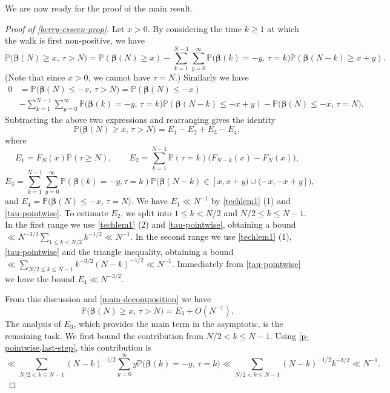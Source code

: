 \documentclass[11pt,reqno]{amsart}
\numberwithin{equation}{section}
\theoremstyle{definition}
\theoremstyle{remark}
\newcommand{\mb}{\mathbb}
\def\boldbeta{\boldsymbol\beta}
\renewcommand{\le}{\leqslant}
\renewcommand{\ge}{\geqslant}
\begin{document}
We are now ready for the proof of the main result.
\begin{proof}[Proof of \cref{berry-esseen-prop}] Let $x > 0$. By considering the time $k \ge 1$ at which the walk is first non-positive, we have
\[ \mb{P}\big(\boldbeta(N) \ge x,\, \tau > N\big) = \mb{P}(\boldbeta(N) \ge x) - \sum_{k = 1}^{N-1} \sum_{y = 0}^{\infty} \mb{P}\big(\boldbeta(k) = -y,\, \tau = k\big) \mb{P}(\boldbeta(N - k) \ge x + y).\] (Note that since $x > 0$, we cannot have $\tau = N$.) 
Similarly we have
\begin{align*} 0 & = \mb{P}\big(\boldbeta(N) \le -x, \,\tau > N)  = \mb{P}(\boldbeta(N) \le -x) \\ & - \sum_{k = 1}^{N-1} \sum_{y = 0}^{\infty} \mb{P}\big(\boldbeta(k) = -y,\, \tau = k\big) \mb{P}(\boldbeta(N - k) \le -x + y) - \mb{P}\big(\boldbeta(N) \le - x, \, \tau = N\big).\end{align*}
Subtracting the above two expressions and rearranging gives the identity
\begin{equation}\label{main-decomposition} \mb{P}\big(\boldbeta(N) \ge x, \, \tau > N\big) = E_1 - E_2 + E_3 - E_4,\end{equation} where
\[ E_1 = 
F_N(x)\mb{P}(\tau \ge N), \qquad E_2 =  \sum_{k = 1}^{N-1} \mb{P}(\tau = k) \big( F_{N - k}(x) - F_N(x) \big),\]  \[ E_3 = \sum_{k = 1}^{N-1} \sum_{y = 0}^{\infty} \mb{P}(\boldbeta(k) = -y, \tau = k) \mb{P} \big( \boldbeta(N- k) \in [x, x + y) \cup (-x, -x + y] \big) ,\] and $E_4 =  \mb{P}\big(\boldbeta(N) \le -x,\, \tau = N\big)$.
We have $E_1 \ll N^{-1}$ by \cref{techlem1} (1) and \cref{tau-pointwise}. To estimate $E_2$, we split into $1 \le k < N/2$ and $N/2 \le k \le N-1$. In the first range we use \cref{techlem1} (2) and \cref{tau-pointwise}, obtaining a bound $\ll N^{-3/2} \sum_{1 \le k < N/2} k^{-1/2} \ll N^{-1}$. In the second range we use \cref{techlem1} (1), \cref{tau-pointwise} and the triangle inequality, obtaining a bound $\ll \sum_{N/2 \le k \le N - 1} k^{-3/2} (N - k)^{-1/2} \ll N^{-1}$. Immediately from \cref{tau-pointwise} we have the bound $E_4 \ll N^{-3/2}$.

From this discussion and \cref{main-decomposition} we have
\begin{equation*} \mb{P}\big(\boldbeta(N) \ge x,\, \tau > N\big) = E_3 + O(N^{-1}).\end{equation*} 
The analysis of $E_3$, which provides the main term in the asymptotic, is the remaining task.
We first bound the contribution from $N/2 < k \le N - 1$. Using \cref{p-pointwise,last-step}, this contribution is 
\[\ll \sum_{N/2 < k \le N - 1} (N - k)^{-1/2} \sum_{y = 0}^{\infty} y \mb{P}\big(\boldbeta(k) = -y,\, \tau = k\big) \ll \sum_{N/2 < k \le N - 1} (N - k)^{-1/2} k^{-3/2} \ll N^{-1}.\]


\end{proof}
\end{document}
